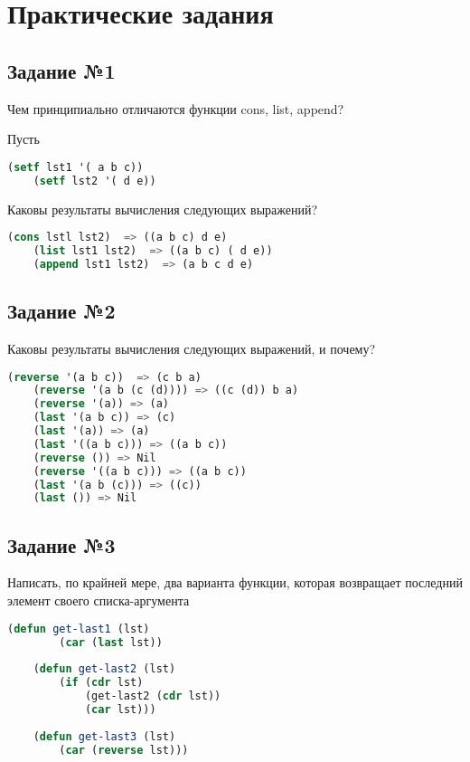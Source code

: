 \chapter{Практические задания}

\section{Задание №1}

Чем принципиально отличаются функции cons, list, append?

Пусть

\begin{lstlisting}[language=Lisp]
	(setf lst1 '( a b c))
	(setf lst2 '( d e))
\end{lstlisting}

Каковы результаты вычисления следующих выражений?

\begin{lstlisting}[language=Lisp]
	(cons lstl lst2)  => ((a b c) d e)
	(list lst1 lst2)  => ((a b c) ( d e))
	(append lst1 lst2)  => (a b c d e)
\end{lstlisting}

\section{Задание №2}

Каковы результаты вычисления следующих выражений, и почему?

\begin{lstlisting}[language=Lisp]
	(reverse '(a b c))  => (c b a)
	(reverse '(a b (c (d)))) => ((c (d)) b a)
	(reverse '(a)) => (a)
	(last '(a b c)) => (c)
	(last '(a)) => (a)
	(last '((a b c))) => ((a b c))
	(reverse ()) => Nil
	(reverse '((a b c))) => ((a b c))
	(last '(a b (c))) => ((c))
	(last ()) => Nil
\end{lstlisting}

\section{Задание №3}

Написать, по крайней мере, два варианта функции, которая возвращает
последний элемент своего списка-аргумента

\begin{lstlisting}[language=Lisp]
	(defun get-last1 (lst)
		(car (last lst))
		
	(defun get-last2 (lst)
		(if (cdr lst)
			(get-last2 (cdr lst))
			(car lst)))
			
	(defun get-last3 (lst)
		(car (reverse lst)))
\end{lstlisting}

